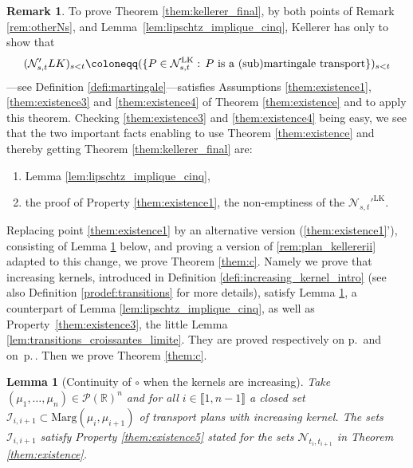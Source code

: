 \documentclass[JEP,XML,SOM,Unicode,NoEqCountersInSection,NoFloatCountersInSection,published]{cedram}
\renewcommand{\theenumi}{\alph{enumi}}
\renewcommand{\theenumii}{\roman{enumii}}
\newenvironment{enumeratei}
{\bgroup\def\theenumi{\roman{enumi}}\def\theenumii{\arabic{enumii}}\begin{enumerate}}
{\end{enumerate}\egroup}
\theoremstyle{plain}
\newtheorem{lem}[them]{Lemma}
\theoremstyle{definition}
\newtheorem{rem}[them]{Remark}
\newcommand{\ML}{\mathrm{LK}}
\newcommand{\eqdefup}{\coloneqq}
\newcommand{\p}{\mathcal{P}}
\newcommand{\ma}{\mathrm{Marg}}
\newcommand{\R}{\mathbb{R}}
\begin{document}
\begin{rem}\label{rem:plan_kellerer}To prove Theorem \ref{them:kellerer_final}, by both points of Remark \ref{rem:otherNs},
and Lem\-ma~\ref{lem:lipschtz_implique_cinq}, Kellerer has only to show that
\[
(\mathcal{N}_{s,t}'^\ML)_{s<t}\eqdefup(\{P\in\mathcal{N}_{s,t}^\ML :\,P\text{ is a (sub)mar\-tin\-gale transport}\})_{s<t}
\]
---see Definition \ref{defi:martingale}---satisfies Assumptions \eqref{them:existence1}, \eqref{them:existence3} and \eqref{them:existence4} of Theorem \ref{them:existence} and to apply this theorem. Checking \eqref{them:existence3} and \eqref{them:existence4} being easy, we see that the two important facts enabling to use Theorem \ref{them:existence} and thereby getting Theorem \ref{them:kellerer_final} are:

\begin{enumeratei}
\item\label{rem:plan_kellereri}
Lemma \ref{lem:lipschtz_implique_cinq},

\item\label{rem:plan_kellererii}
the proof of Property \eqref{them:existence1}, \ie the non-emptiness of the $\mathcal{N}_{s,t}'^\ML$.
\end{enumeratei}
\end{rem}

Replacing point \eqref{them:existence1} by an alternative version (\ref{them:existence1}'), consisting of Lemma \ref{lem:closed} below, and proving a version of \eqref{rem:plan_kellererii} adapted to this change, we prove Theorem \ref{them:c}. Namely we prove that increasing kernels, introduced in Definition \ref{defi:increasing_kernel_intro} (see also Definition \ref{prodef:transitions} for more details), satisfy Lemma \ref{lem:closed}, a counterpart of Lemma \ref{lem:lipschtz_implique_cinq}, as well as Property~\eqref{them:existence3}, \ie the little Lemma \ref{lem:transitions_croissantes_limite}. They are proved respectively on p.\,\pageref{proof:lem:closed} and on~p.\,\pageref{proof:lem:transitions_croissantes_limite}. Then we prove Theorem \ref{them:c}.

\begin{lem}[Continuity of $\circ$ when the kernels are increasing]\label{lem:closed}Take $
(\mu_1,\ldots,\mu_n)\in\p(\R)^n$ and for all $i\in\llbracket1,n-1\rrbracket$ a closed set $\mathcal{I}_{i,i+1}\subset\ma(\mu_i,\mu_{i+1})$ of transport plans with increasing kernel. The sets $\mathcal{I}_{i,i+1}$ satisfy Property \eqref{them:existence5} stated for the sets $\mathcal{N}_{t_i,t_{i+1}}$ in Theorem \ref{them:existence}.
\end{lem}
\end{document}
